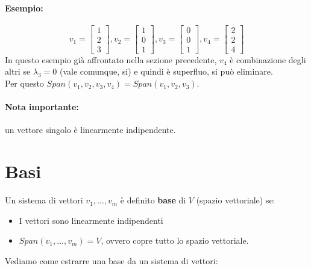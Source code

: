\documentclass[12pt,a4paper]{article}
\let\oldsection\section
\renewcommand{\section}{\clearpage\oldsection}
\begin{document}
\paragraph{Esempio:}
\[
v_1 = \begin{bmatrix}
  1\\
  2\\
  3
\end{bmatrix}, v_2 = \begin{bmatrix}
  1\\
  0\\
  1
\end{bmatrix}, v_3 = \begin{bmatrix}
  0\\
  0\\
  1
\end{bmatrix}, v_4 = \begin{bmatrix}
  2\\
  2\\
  4
\end{bmatrix}
\]
In questo esempio già affrontato nella sezione precedente, $v_4$ è combinazione degli altri se $\lambda_3 = 0$ (vale comunque, si) e quindi è superfluo, si può eliminare.\\
Per questo $Span(v_1,v_2,v_3,v_4) = Span(v_1,v_2,v_3)$.
\paragraph{Nota importante:} un vettore singolo è linearmente indipendente.
\section{Basi}
Un sistema di vettori $v_1,\ldots,v_m$ è definito \textbf{base} di $V$ (spazio vettoriale) se:
\begin{itemize}
  \item I vettori sono linearmente indipendenti
  \item $Span(v_1,\ldots,v_m) = V$, ovvero copre tutto lo spazio vettoriale.\\
\end{itemize}
Vediamo come estrarre una base da un sistema di vettori:
\end{document}
